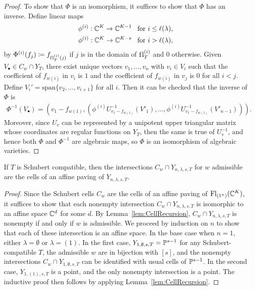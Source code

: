 \documentclass[12pt]{amsart}
\newcommand{\vspan}{\mathrm{span}}
\newcommand{\Fl}{\mathrm{Fl}}
\newcommand{\la}{\lambda}
\newcommand{\fl}{\mathrm{f\hspace{0.25pt}l}}
\begin{document}
\begin{proof}
To show that $\Phi$ is an isomorphism, it suffices to show that $\Phi$ has an inverse. Define linear maps
\begin{align}
    \phi^{(i)} : \bC^K \to \bC^{K-1} & \,\,\,\text{  for  }i\leq \ell(\la),\\
    \phi^{(i)} : \bC^K \to \bC^{K-s} & \,\,\,\text{  for  }i>\ell(\la),
\end{align}
by $\Phi^{(i)}(f_j) \coloneqq f_{\fl_T^{(i)}(j)}$ if $j$ is in the domain of $\fl_T^{(i)}$ and $0$ otherwise.
Given $V_\bullet\in C_w\cap Y_T$, there exist unique vectors $v_1,\dots, v_n$ with $v_i\in V_i$ such that the coefficient of $f_{w(i)}$ in $v_i$ is $1$ and the coefficient of $f_{w(i)}$ in $v_j$ is $0$ for all $i<j$. Define $V_i' = \vspan\{v_2,\dots, v_{i+1}\}$ for all $i$. Then it can be checked that the inverse of $\Phi$ is 
\begin{align}
    \Phi^{-1}(V_\bullet) = (v_1-f_{w(1)}, (\phi^{(i)}U_{v_1-f_{w(1)}}^{-1}(V'_1),\dots,\phi^{(i)}U_{v_1-f_{w(1)}}^{-1}(V'_{n-1}))).
\end{align}
Moreover, since $U_v$ can be represented by a unipotent upper triangular matrix whose coordinates are regular functions on $Y_{T}$, then the same is true of $U_v^{-1}$, and hence both $\Phi$ and $\Phi^{-1}$ are algebraic maps, so $\Phi$ is an isomorphism of algebraic varieties.
\end{proof}

 

\begin{theorem}\label{thm:AffinePavingY}
If $T$ is Schubert compatible, then the intersections $C_w\cap Y_{n,\la,s,T}$ for $w$ admissible are the cells of an affine paving of $Y_{n,\la,s,T}$.
\end{theorem}

\begin{proof}
Since the Schubert cells $C_w$ are the cells of an affine paving of $\Fl_{(1^n)}(\bC^K)$, it suffices to show that each nonempty intersection $C_w\cap Y_{n,\la,s,T}$ is isomorphic to an affine space $\mathbb{C}^d$ for some $d$. By Lemma~\ref{lem:CellRecursion}, $C_w\cap Y_{n,\la,s,T}$ is nonempty if and only if $w$ is admissible. We proceed by induction on $n$ to show that each of these intersection is an affine space. In the base case when $n=1$, either $\lambda =\emptyset$ or $\lambda = (1)$. In the first case, $Y_{1,\emptyset,s,T} = \mathbb{P}^{s-1}$ for any Schubert-compatible $T$, the admissible $w$ are in bijection with $[s]$, and the nonempty intersections $C_w\cap Y_{1,\emptyset,s,T}$ can be identified with usual cells of $\mathbb{P}^{s-1}$. In the second case, $Y_{1,(1),s,T}$ is a point, and the only nonempty intersection is a point. The inductive proof then follows by applying Lemma~\ref{lem:CellRecursion}.
\end{proof}
\end{document}
